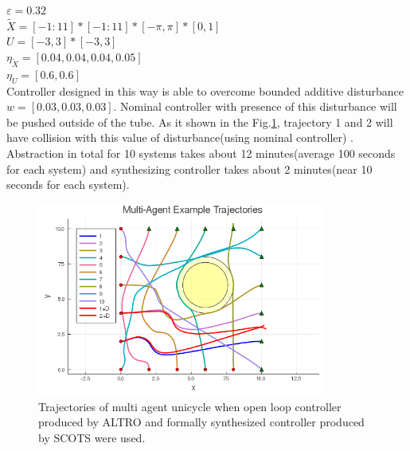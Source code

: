 $\varepsilon=0.32$\\
$\widetilde{X}=[-1:11]*[-1:11]*[-\pi,\pi]*[0,1]$\\
$U=[-3,3]*[-3,3]$\\
$\eta_{\widetilde{X}}=[0.04,0.04,0.04,0.05]$\\
$\eta_{U}=[0.6,0.6]$\\
Controller designed in this way is able to overcome bounded additive disturbance $w=[0.03,0.03,0.03]$. Nominal controller with presence of this disturbance will be pushed outside of the tube. As it shown in the Fig.\ref{fig:MA}, trajectory 1 and 2 will have collision with this value of disturbance(using nominal controller) . Abstraction in total for 10 systems takes about 12 minutes(average 100 seconds for each system) and synthesizing controller takes about 2 minutes(near 10 seconds for each system).
\begin{figure}[t]\label{fig:MA}
	\centering
	\includegraphics[width=0.85\textwidth]{figures/MA.png}
	\caption{Trajectories of multi agent unicycle when open loop controller produced by ALTRO and formally synthesized controller produced by SCOTS were used.}
\end{figure}





